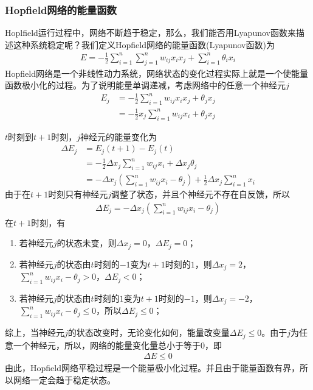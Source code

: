         \subsubsection{Hopfield网络的能量函数}
            \par
            Hoplfield运行过程中，网络不断趋于稳定，那么，我们能否用Lyapunov函数来描述这种系统稳定呢？我们定义Hopfield网络的能量函数(Lyapunov函数)为
            \begin{align*}
            E = -\frac{1}{2} \sum_{i=1}^n\sum_{j=1}^n w_{ij}x_ix_j+\sum_{i=1}^n\theta_ix_i
            \end{align*}
            Hopfield网络是一个非线性动力系统，网络状态的变化过程实际上就是一个使能量函数极小化的过程。为了说明能量单调递减，考虑网络中的任意一个神经元$j$
            \begin{align*}
            E_j & = -\frac{1}{2}\sum_{i=1}^n w_{ij}x_ix_j + \theta_jx_j\\
            & =-\frac{1}{2} x_j\sum_{i=1}^n w_{ij}x_i + \theta_j x_j
            \end{align*}
            \par
            $t$时刻到$t+1$时刻，$j$神经元的能量变化为
            \begin{align*}
            \Delta E_j & = E_j(t+1) - E_j(t) \\
            & =-\frac{1}{2} \Delta x_j\sum_{i=1}^nw_{ij}x_i +\Delta x_j\theta_j\\
            & =- \Delta x_j \left( \sum_{i=1}^nw_{ij}x_i - \theta_j \right) +\frac{1}{2}\Delta x_j \sum_{i=1}^n x_i
            \end{align*}
            由于在$t+1$时刻只有神经元$j$调整了状态，并且个神经元不存在自反馈，所以
            \begin{align*}
            \Delta E_j = -\Delta x_j \left( \sum_{i=1}^nw_{ij}x_i - \theta_j \right)
            \end{align*}
            在$t+1$时刻，有
            \begin{enumerate}
            \item 若神经元$j$的状态未变，则$\Delta x_j = 0$，$\Delta E_j =0 $；
            \item 若神经元$j$的状态由$t$时刻的$-1$变为$t+1$时刻的$1$，则$\Delta x_j = 2$，$ \sum_{i=1}^nw_{ij}x_i - \theta_j > 0$，$\Delta E_j <0$；
            \item 若神经元$j$的状态由$t$时刻的$1$变为$t+1$时刻的$-1$，则$\Delta x_j = -2$，$ \sum_{i=1}^nw_{ij}x_i - \theta_j \leqslant 0$，所以$\Delta E_j \leqslant 0$；
            \end{enumerate}
            综上，当神经元$j$的状态改变时，无论变化如何，能量改变量$\Delta E_j \leqslant 0$。由于$j$为任意一个神经元，所以，网络的能量变化量总小于等于0，即
            \begin{align*}
            \Delta E \leqslant 0
            \end{align*}
            由此，Hopfield网络平稳过程是一个能量极小化过程。并且由于能量函数有界，所以网络一定会趋于稳定状态。
